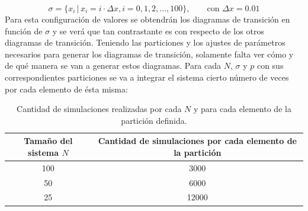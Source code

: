 \begin{equation}
	\sigma = \{x_i\, |\, x_i=i\cdot\Delta x, i=0,1,2,...,100\},\qquad\text{con }\Delta x=0.01
\end{equation}
Para esta configuración de valores se obtendrán los diagramas de transición en función de $\sigma$ y se verá que tan contrastante es con respecto de los otros diagramas de transición. Teniendo las particiones y los ajustes de parámetros necesarios para generar los diagramas de transición, solamente falta ver cómo y de qué manera se van a generar estos diagramas. Para cada $N$, $\sigma$ y $p$ con sus correspondientes particiones se va a integrar el sistema cierto número de veces por cada elemento de ésta misma:
\newpage
\begin{table}[h!]
	\centering
	\begin{tabular}{|c|c|}
		\hline
		Tamaño del sistema $N$ & Cantidad de simulaciones por cada elemento de la partición  \\ \hline
		100 & 3000 \\ \hline
		50  & 6000 \\ \hline
		25  & 12000 \\ \hline		
 	\end{tabular}
	\caption{Cantidad de simulaciones realizadas por cada $N$ y para cada elemento de la partición definida.}
	\label{tab:SimulacionesTransicion}
\end{table} 

